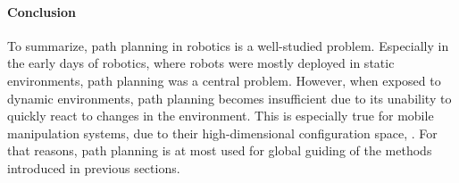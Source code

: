 \paragraph{Conclusion}

To summarize, path planning in robotics is a well-studied
problem. Especially in the early days of robotics, where
robots were mostly deployed in static environments, path
planning was a central problem. However, when exposed to
dynamic environments, path planning becomes insufficient due
to its unability to quickly react to changes in the
environment. This is especially true for mobile manipulation
systems, due to their high-dimensional configuration space,
\cite{Avanzini2018}. For that reasons, path planning is at
most used for global guiding of the methods introduced
in previous sections.



